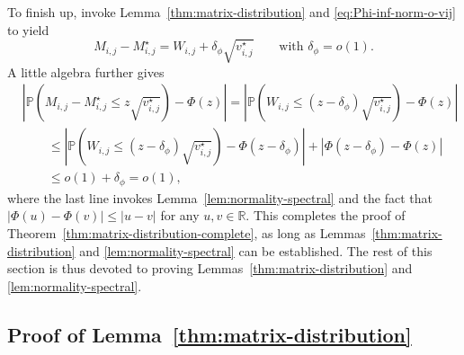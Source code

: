 To finish up, invoke Lemma~\ref{thm:matrix-distribution} and \eqref{eq:Phi-inf-norm-o-vij} to yield
%
\[
	M_{i,j}-M_{i,j}^{\star}=W_{i,j}+\delta_{\phi}\sqrt{v_{i,j}^{\star}}\qquad\text{with }\delta_{\phi}=o(1).
\]
%
A little algebra further gives
%
\begin{align*}
 & \left|\mathbb{P}\left( M_{i,j}-M_{i,j}^{\star}\leq z\sqrt{v_{i,j}^{\star}}\right) -\Phi(z)\right|=\left|\mathbb{P}\left( W_{i,j}\leq\left(z-\delta_{\phi}\right)\sqrt{v_{i,j}^{\star}}\right) -\Phi(z)\right|\\
 & \qquad \leq \left|\mathbb{P}\left( W_{i,j}\leq\left(z-\delta_{\phi}\right)\sqrt{v_{i,j}^{\star}}\right)  -\Phi(z-\delta_{\phi})\right|+\left|\Phi(z-\delta_{\phi})-\Phi(z)\right|\\
 & \qquad\leq o(1)+\delta_{\phi}=o(1),
\end{align*}
%
where the last line invokes Lemma~\ref{lem:normality-spectral} and the fact that $|\Phi(u)-\Phi(v)|\leq |u-v|$ for any $u,v\in \mathbb{R}$. 
This completes the proof of  Theorem~\ref{thm:matrix-distribution-complete}, as long as Lemmas~\ref{thm:matrix-distribution} and \ref{lem:normality-spectral} can be established. 
The rest of this section is thus devoted to proving Lemmas~\ref{thm:matrix-distribution} and \ref{lem:normality-spectral}. 






\subsection{Proof of Lemma~\ref{thm:matrix-distribution}}
\label{sec:sub-proof-thm:matrix-distribution}



